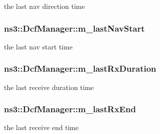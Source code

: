 the last nav direction time 

\subsubsection[{\texorpdfstring{m\+\_\+last\+Nav\+Start}{m_lastNavStart}}]{ ns3\+::\+Dcf\+Manager\+::m\+\_\+last\+Nav\+Start\hspace{0.3cm}{\ttfamily [private]}}\hypertarget{classns3_1_1DcfManager_a9b355425c50b92120b02980aedd14c8b}{}\label{classns3_1_1DcfManager_a9b355425c50b92120b02980aedd14c8b}


the last nav start time 

\subsubsection[{\texorpdfstring{m\+\_\+last\+Rx\+Duration}{m_lastRxDuration}}]{ ns3\+::\+Dcf\+Manager\+::m\+\_\+last\+Rx\+Duration\hspace{0.3cm}{\ttfamily [private]}}\hypertarget{classns3_1_1DcfManager_ab43fe243e604d9b329ccffdfbbba6499}{}\label{classns3_1_1DcfManager_ab43fe243e604d9b329ccffdfbbba6499}


the last receive duration time 

\subsubsection[{\texorpdfstring{m\+\_\+last\+Rx\+End}{m_lastRxEnd}}]{ ns3\+::\+Dcf\+Manager\+::m\+\_\+last\+Rx\+End\hspace{0.3cm}{\ttfamily [private]}}\hypertarget{classns3_1_1DcfManager_aeb45605e9f45e17ec4dac9e7a5e99430}{}\label{classns3_1_1DcfManager_aeb45605e9f45e17ec4dac9e7a5e99430}


the last receive end time 

